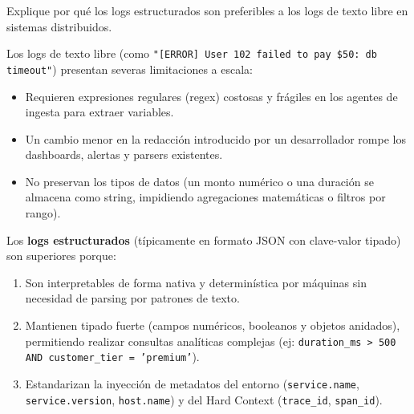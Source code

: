 \documentclass[variant=guia,cover=institutional,mode=screen]{ua-engineering-v6-article}
\begin{document}
\begin{uaexercise}
Explique por qué los logs estructurados son preferibles a los logs de texto libre en sistemas distribuidos.
\end{uaexercise}
\begin{uaanswer}
Los logs de texto libre (como \texttt{"[ERROR] User 102 failed to pay \$50: db timeout"}) presentan severas limitaciones a escala:
\begin{itemize}
\item Requieren expresiones regulares (regex) costosas y frágiles en los agentes de ingesta para extraer variables.
\item Un cambio menor en la redacción introducido por un desarrollador rompe los dashboards, alertas y parsers existentes.
\item No preservan los tipos de datos (un monto numérico o una duración se almacena como string, impidiendo agregaciones matemáticas o filtros por rango).
\end{itemize}

Los \textbf{logs estructurados} (típicamente en formato JSON con clave-valor tipado) son superiores porque:
\begin{enumerate}
\item Son interpretables de forma nativa y determinística por máquinas sin necesidad de parsing por patrones de texto.
\item Mantienen tipado fuerte (campos numéricos, booleanos y objetos anidados), permitiendo realizar consultas analíticas complejas (ej: \texttt{duration\_ms > 500 AND customer\_tier = 'premium'}).
\item Estandarizan la inyección de metadatos del entorno (\texttt{service.name}, \texttt{service.version}, \texttt{host.name}) y del Hard Context (\texttt{trace\_id}, \texttt{span\_id}).
\end{enumerate}
\end{uaanswer}
\end{document}
